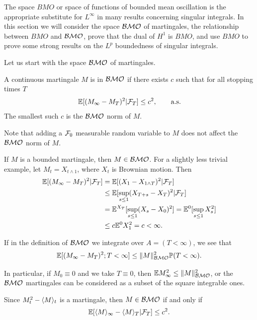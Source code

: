The space $BMO$ or space of functions of bounded mean oscillation is the
appropriate substitute for $L^\infty$ in many results concerning singular integrals. In this section we will consider the space $\mathcal{BMO}$ of martingales, the  relationship between $BMO$ and $\mathcal{BMO}$, prove that the dual of $H^1$ is $BMO$, and use $BMO$ to prove some strong results on the $L^p$ boundedness of singular integrals.

Let us start with the space $\mathcal{BMO}$ of martingales.

\begin{definition}\label{def:ch4_7.1}
A continuous martingale $M$ is in $\mathcal{BMO}$ if there exists $c$ such that for all stopping times $T$
\[
    \mathbb{E}[(M_\infty - M_T)^2|\mathcal{F}_T] \leq c^2, \qquad \textnormal{a.s.}
\]
The smallest such $c$ is the $\mathcal{BMO}$ norm of $M$.
\end{definition}

Note that adding a $\mathcal{F}_0$ measurable random variable to $M$ does not affect the $\mathcal{BMO}$ norm of $M$.

If $M$ is a bounded martingale, then $M \in \mathcal{BMO}$. For a slightly less trivial example, let $M_t = X_{t\wedge 1}$, where $X_t$ is Brownian motion. Then
\begin{align*}
    \mathbb{E}[(M_\infty - M_T)^2|\mathcal{F}_T] &= \mathbb{E}[(X_1 - X_{1\wedge T})^2| \mathcal{F}_T] \\
    &\leq \mathbb{E}[\sup_{s\leq 1}(X_{T+s} - X_T)^2| \mathcal{F}_T] \\
    &= \mathbb{E}^{X_T}[\sup_{s\leq 1}(X_s - X_0)^2] = \mathbb{E}^0[\sup_{s\leq 1}X_s^2] \\
    &\leq c\mathbb{E}^0X_1^2 = c < \infty.
\end{align*}

If in the definition of $\mathcal{BMO}$ we integrate over $A = (T < \infty)$, we see that
\begin{equation}\label{eq:ch4_7.1}
    \mathbb{E}[(M_\infty - M_T)^2; T < \infty] \leq \|M\|^2_{\mathcal{BMO}}\mathbb{P}(T < \infty).
\end{equation}

In particular, if $M_0 \equiv 0$ and we take $T \equiv 0$, then $\mathbb{E} M_\infty^2 \leq \|M\|^2_{\mathcal{BMO}}$, or the $\mathcal{BMO}$ martingales can be considered as a subset of the square integrable ones.

Since $M_t^2 - \langle M \rangle_t$ is a martingale, then $M \in \mathcal{BMO}$ if and only if
\begin{equation}\label{eq:ch4_7.2}
    \mathbb{E}[\langle M \rangle_\infty - \langle M \rangle_T| \mathcal{F}_T] \leq c^2.
\end{equation}

